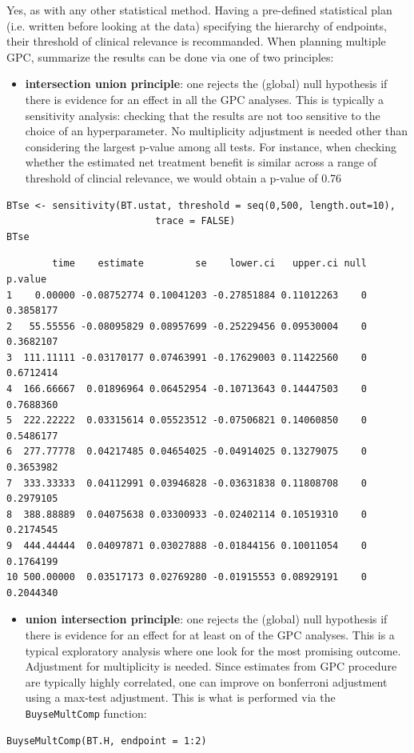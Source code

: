 \documentclass[12pt]{article}
\begin{document}
Yes, as with any other statistical method. Having a pre-defined
statistical plan (i.e. written before looking at the data) specifying
the hierarchy of endpoints, their threshold of clinical relevance is
recommanded. When planning multiple GPC, summarize the results can be
done via one of two principles:
\begin{itemize}
\item \textbf{intersection union principle}: one rejects the (global) null
hypothesis if there is evidence for an effect in all the GPC
analyses. This is typically a sensitivity analysis: checking that
the results are not too sensitive to the choice of an
hyperparameter. No multiplicity adjustment is needed other than
considering the largest p-value among all tests. For instance, when
checking whether the estimated net treatment benefit is similar across a range
of threshold of clincial relevance, we would obtain a p-value of
0.76
\end{itemize}
\lstset{language=r,label= ,caption= ,captionpos=b,numbers=none}
\begin{lstlisting}
BTse <- sensitivity(BT.ustat, threshold = seq(0,500, length.out=10),
                          trace = FALSE)
BTse
\end{lstlisting}

\begin{verbatim}
        time    estimate         se    lower.ci   upper.ci null   p.value
1    0.00000 -0.08752774 0.10041203 -0.27851884 0.11012263    0 0.3858177
2   55.55556 -0.08095829 0.08957699 -0.25229456 0.09530004    0 0.3682107
3  111.11111 -0.03170177 0.07463991 -0.17629003 0.11422560    0 0.6712414
4  166.66667  0.01896964 0.06452954 -0.10713643 0.14447503    0 0.7688360
5  222.22222  0.03315614 0.05523512 -0.07506821 0.14060850    0 0.5486177
6  277.77778  0.04217485 0.04654025 -0.04914025 0.13279075    0 0.3653982
7  333.33333  0.04112991 0.03946828 -0.03631838 0.11808708    0 0.2979105
8  388.88889  0.04075638 0.03300933 -0.02402114 0.10519310    0 0.2174545
9  444.44444  0.04097871 0.03027888 -0.01844156 0.10011054    0 0.1764199
10 500.00000  0.03517173 0.02769280 -0.01915553 0.08929191    0 0.2044340
\end{verbatim}
\begin{itemize}
\item \textbf{union intersection principle}: one rejects the (global) null
hypothesis if there is evidence for an effect for at least on of the
GPC analyses. This is a typical exploratory analysis where one look
for the most promising outcome. Adjustment for multiplicity is
needed.  Since estimates from GPC procedure are typically highly
correlated, one can improve on bonferroni adjustment using a
max-test adjustment. This is what is performed via the
\texttt{BuyseMultComp} function:
\end{itemize}
\lstset{language=r,label= ,caption= ,captionpos=b,numbers=none}
\begin{lstlisting}
BuyseMultComp(BT.H, endpoint = 1:2)
\end{lstlisting}
\end{document}
